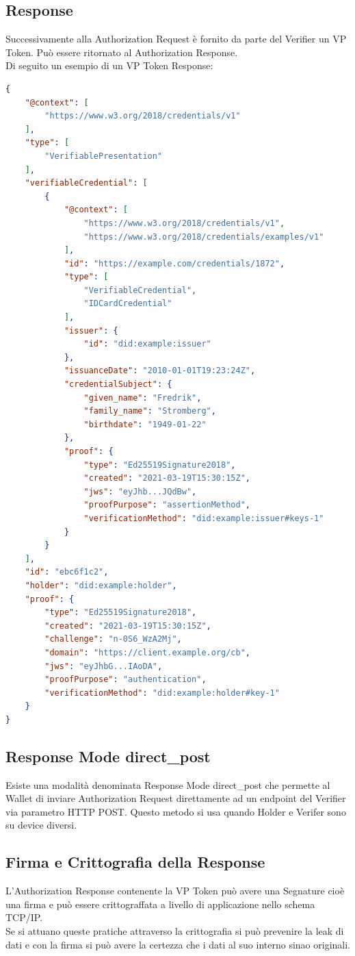 \subsection{Response}
Successivamente alla Authorization Request è fornito da parte del Verifier un VP Token.
Può essere ritornato al Authorization Response.
\\Di seguito un esempio di un VP Token Response:
\begin{lstlisting}[language=json,firstnumber=1]
{
    "@context": [
        "https://www.w3.org/2018/credentials/v1"
    ],
    "type": [
        "VerifiablePresentation"
    ],
    "verifiableCredential": [
        {
            "@context": [
                "https://www.w3.org/2018/credentials/v1",
                "https://www.w3.org/2018/credentials/examples/v1"
            ],
            "id": "https://example.com/credentials/1872",
            "type": [
                "VerifiableCredential",
                "IDCardCredential"
            ],
            "issuer": {
                "id": "did:example:issuer"
            },
            "issuanceDate": "2010-01-01T19:23:24Z",
            "credentialSubject": {
                "given_name": "Fredrik",
                "family_name": "Stromberg",
                "birthdate": "1949-01-22"
            },
            "proof": {
                "type": "Ed25519Signature2018",
                "created": "2021-03-19T15:30:15Z",
                "jws": "eyJhb...JQdBw",
                "proofPurpose": "assertionMethod",
                "verificationMethod": "did:example:issuer#keys-1"
            }
        }
    ],
    "id": "ebc6f1c2",
    "holder": "did:example:holder",
    "proof": {
        "type": "Ed25519Signature2018",
        "created": "2021-03-19T15:30:15Z",
        "challenge": "n-0S6_WzA2Mj",
        "domain": "https://client.example.org/cb",
        "jws": "eyJhbG...IAoDA",
        "proofPurpose": "authentication",
        "verificationMethod": "did:example:holder#key-1"
    }
}
\end{lstlisting}

\subsection{Response Mode direct\_post}
Esiste una modalità denominata Response Mode direct\_post che permette al Wallet di inviare Authorization Request 
direttamente ad un endpoint del Verifier via parametro HTTP POST. Questo metodo si usa quando Holder e Verifer sono su device diversi.

\subsection{Firma e Crittografia della Response}
L'Authorization Response contenente la VP Token può avere una Segnature cioè una firma e può essere crittograffata
a livello di applicazione nello schema TCP/IP.\\
Se si attuano queste pratiche attraverso la crittografia si può prevenire la leak di dati e con la firma si può avere la certezza che 
i dati al suo interno sinao originali.

